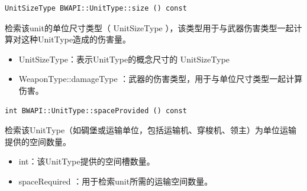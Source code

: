 \begin{tcolorbox}[colback=white, colframe=black!60!white, title=size(), arc=0mm]
    \begin{verbatim}
UnitSizeType BWAPI::UnitType::size () const
    \end{verbatim}
    检索该unit的单位尺寸类型（  UnitSizeType  ），该类型用于与武器伤害类型一起计算对这种UnitType造成的伤害量。
    \begin{return}
        \begin{itemize}
            \item UnitSizeType：表示UnitType的概念尺寸的   UnitSizeType
        \end{itemize}
    \end{return}
    \begin{refer}
        \begin{itemize}
            \item  WeaponType::damageType  ：武器的伤害类型，用于与单位尺寸类型一起计算伤害。
        \end{itemize}
    \end{refer}
\end{tcolorbox}


\begin{tcolorbox}[colback=white, colframe=black!60!white, title=spaceProvided(), arc=0mm]
    \begin{verbatim}
int BWAPI::UnitType::spaceProvided () const
    \end{verbatim}
    检索该UnitType（如碉堡或运输单位，包括运输机、穿梭机、领主）为单位运输提供的空间数量。
    \begin{return}
        \begin{itemize}
            \item int：该UnitType提供的空间槽数量。
        \end{itemize}
    \end{return}
    \begin{refer}
        \begin{itemize}
            \item  spaceRequired  ：用于检索unit所需的运输空间数量。
        \end{itemize}
    \end{refer}
\end{tcolorbox}


